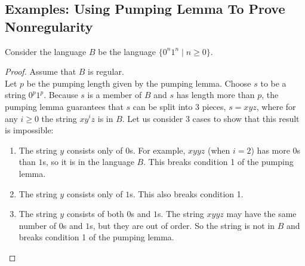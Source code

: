 \documentclass[11pt,a4paper]{article}
\begin{document}
\subsection{Examples: Using Pumping Lemma To Prove Nonregularity}
\begin{example}
    Consider the language $B$ be the language $\{0^n1^n\mid n\geq 0\}$.

    \begin{proof}
        Assume that $B$ is regular. \\
        
        Let $p$ be the pumping length given by the pumping lemma.
        Choose $s$ to be a string $0^p1^p$. Because $s$ is a member of $B$ and $s$ has length more than $p$, the pumping lemma guarantees that $s$ can be split into 3 pieces, $s=xyz$, where for any $i\geq 0$ the string $xy^iz$ is in $B$.
        Let us consider 3 cases to show that this result is impossible:

        \begin{enumerate}
            \item The string $y$ consists only of $0$s. For example, $xyyz$ (when $i=2$) has more $0$s than $1$s, so it is in the language $B$. This breaks condition 1 of the pumping lemma.
            \item The string $y$ consists only of $1$s. This also breaks condition 1.
            \item The string $y$ consists of both $0$s and $1$s. The string $xyyz$ may have the same number of $0$s and $1$s, but they are out of order. So the string is not in $B$ and breaks condition 1 of the pumping lemma.
        \end{enumerate}
    \end{proof}
\end{example}
\end{document}

